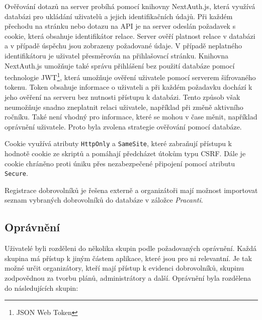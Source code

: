 Ověřování dotazů na server probíhá pomocí knihovny NextAuth.js, která využívá databázi pro ukládání uživatelů a jejich identifikačních údajů. Při každém přechodu na stránku
nebo dotazu na API je na server odeslán požadavek s cookie, která obsahuje identifikátor relace. Server ověří platnost relace v databázi a v případě úspěchu jsou zobrazeny
požadované údaje. V případě neplatného identifikátoru je uživatel přesměrován na přihlašovací stránku. Knihovna NextAuth.js umožňuje také správu přihlášení bez použití databáze pomocí
technologie JWT\footnote{JSON Web Token}, která umožňuje ověření uživatele pomocí serverem šifrovaného tokenu. Token obsahuje informace o uživateli 
a při každém požadavku dochází k jeho ověření na serveru bez nutnosti přístupu k databázi. Tento způsob však neumožňuje snadno zneplatnit relaci uživatele, například při změně aktivního ročníku.
Také není vhodný pro informace, které se mohou v čase měnit, například oprávnění uživatele. Proto byla zvolena strategie ověřování pomocí databáze.

Cookie využívá atributy \texttt{HttpOnly} a \texttt{SameSite}, které zabraňují přístupu k hodnotě cookie ze skriptů a
pomáhají předcházet útokům typu CSRF. Dále je cookie chráněno proti úniku přes nezabezpečené připojení pomocí atributu \texttt{Secure}. 

Registrace dobrovolníků je řešena externě a organizátoři mají možnost importovat seznam vybraných dobrovolníků do databáze v záložce \textit{Pracanti}.

\subsection{Oprávnění}

Uživatelé byli rozděleni do několika skupin podle požadovaných oprávnění. Každá skupina má přístup k jiným částem aplikace, které jsou pro ni relevantní.
Je tak možné určit organizátory, kteří mají přístup k evidenci dobrovolníků, skupinu zodpovědnou za tvorbu plánů, administrátory a další.
Oprávnění byla rozdělena do následujících skupin:

